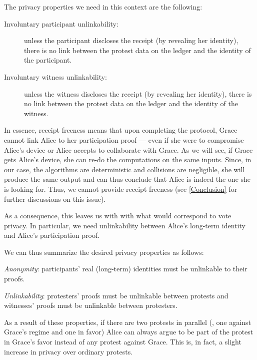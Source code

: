 The privacy properties we need in this context are the following:
\begin{description}
\item[Involuntary participant unlinkability:]  unless the participant discloses the receipt 
   (by revealing her identity), there is no link between the protest data on 
   the ledger and the identity of the participant.
 \item[Involuntary witness unlinkability:]  unless the witness discloses the receipt (by revealing her 
   identity), there is no link between the protest data on the ledger and the 
   identity of the witness.
\end{description}
In essence, receipt freeness means that upon completing the protocol, Grace cannot link Alice to her participation proof --- even if she were to compromise Alice's device or Alice accepts to collaborate with Grace.
As we will see, if Grace gets Alice's device, she can re-do the computations on the same inputs.
Since, in our case, the algorithms are deterministic and collisions are negligible, she will produce the same output and can thus conclude that Alice is indeed the one she is looking for.
Thus, we cannot provide receipt freeness (see \cref{Conclusion} for further discussions on this issue).

As a consequence, this leaves us with with what would correspond to vote privacy.
In particular, we need unlinkability between Alice's long-term identity and Alice's participation proof.

We can thus summarize the desired privacy properties as follows:
\begin{requirements}[P]
\item\label{ProofUnlink} \emph{Anonymity}: participants' real (long-term) 
  identities must be unlinkable to their proofs.
\item\label{ProtestUnlink} \emph{Unlinkability}: protesters' proofs must be 
  unlinkable between protests and witnesses' proofs must be unlinkable between 
  protesters.
\end{requirements}

As a result of these properties, if there are two protests in parallel (\eg, one against Grace's regime and one in favor) Alice can always argue to be part of the protest in Grace's favor instead of any protest against Grace.
This is, in fact, a slight increase in privacy over ordinary protests.